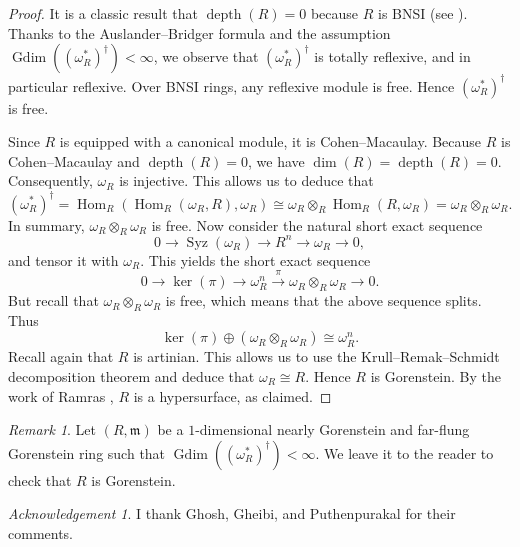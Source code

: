 \documentclass[10. pt,a4paper]{amsart}
\theoremstyle{definition}
\theoremstyle{remark}
\newtheorem{remark}[theorem]{Remark}\newtheorem{fact}[theorem]{Fact}
\newtheorem{acknowledgement}{Acknowledgement}
\newcommand{\Hom}{\operatorname{Hom}}
\newcommand{\depth}{\operatorname{depth}}
\newcommand{\lo}{\longrightarrow}
\begin{document}
\begin{proof}
	It is a classic result that $\operatorname{depth}(R) = 0$ because $R$ is   BNSI (see \cite[Page~299 Remark]{ram}). Thanks to the Auslander--Bridger formula and the assumption $\operatorname{Gdim}((\omega_R^\ast)^\dagger) < \infty$, we observe that $(\omega_R^\ast)^\dagger$ is totally reflexive, and in particular reflexive. Over  BNSI rings, any reflexive module is free. Hence $(\omega_R^\ast)^\dagger$ is free.
	
	Since $R$ is equipped with a canonical module, it is Cohen--Macaulay. Because $R$ is Cohen--Macaulay and $\operatorname{depth}(R) = 0$, we have $\dim(R) = \depth(R) = 0$. Consequently, $\omega_R$ is injective. This allows us to deduce that
	\[
	(\omega_R^\ast)^\dagger = \Hom_R(\Hom_R(\omega_R, R), \omega_R) \cong \omega_R \otimes_R \Hom_R(R, \omega_R) = \omega_R \otimes_R \omega_R.
	\]
	In summary, $\omega_R \otimes_R \omega_R$ is free. Now consider the natural short exact sequence
	\[
	0 \lo \operatorname{Syz}(\omega_R) \lo R^n \lo \omega_R \lo 0,
	\]
	and tensor it with $\omega_R$. This yields the short exact sequence
	\[
	0  \lo\ker(\pi)  \lo \omega_R^n \stackrel{\pi} \lo \omega_R \otimes_R \omega_R  \lo 0.
	\]
	But recall that $\omega_R \otimes_R \omega_R$ is free, which means that the above sequence splits. Thus
	\[
	\ker(\pi) \oplus (\omega_R \otimes_R \omega_R) \cong \omega_R^n.
	\]
	Recall again that $R$ is artinian. This allows us to use the Krull--Remak--Schmidt decomposition theorem and deduce that $\omega_R \cong R$. Hence $R$ is Gorenstein. By the work of Ramras \cite[Poposition 4.1]{ram}, $R$ is a hypersurface, as claimed.
\end{proof}

\begin{remark}
	Let $(R, \mathfrak{m})$ be a $1$-dimensional nearly Gorenstein and far-flung Gorenstein ring such that $\operatorname{Gdim}((\omega_R^\ast)^\dagger) < \infty$. We leave it to the reader to check that $R$ is Gorenstein.
\end{remark}

\begin{acknowledgement}
	I thank Ghosh, Gheibi, and Puthenpurakal for their comments.
\end{acknowledgement}
\maketitle



	
	
\end{document}

